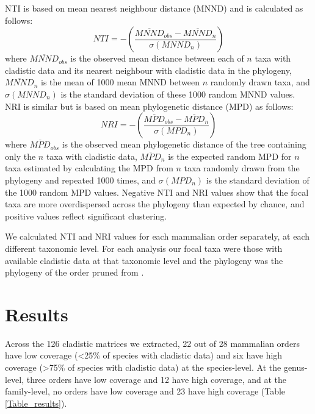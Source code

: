 NTI \citep{webb2002phylogenies} is based on mean nearest neighbour distance (MNND) and is calculated as follows:
  \begin{equation}
    NTI=-\left(\frac{\overline{MNND}_{obs}-\overline{MNND}_{n}}{\sigma(MNND_{n})}\right)
  \end{equation}
where $\overline{MNND}_{obs}$ is the observed mean distance between each of $n$ taxa with cladistic data and its nearest neighbour with cladistic data in the phylogeny, 
$\overline{MNND}_{n}$ is the mean of 1000 mean MNND between $n$ randomly drawn taxa, and $\sigma(MNND_{n})$ is the standard deviation of these 1000 random MNND values.
NRI is similar but is based on mean phylogenetic distance (MPD) as follows:
  \begin{equation}
    NRI=-\left(\frac{\overline{MPD}_{obs}-\overline{MPD}_{n}}{\sigma(MPD_{n})}\right)
  \end{equation}
where $\overline{MPD}_{obs}$ is the observed mean phylogenetic distance of the tree containing only the $n$ taxa with cladistic data, $\overline{MPD}_{n}$ is the expected random MPD for $n$ taxa estimated by calculating the MPD from $n$ taxa randomly drawn from the phylogeny and repeated 1000 times, and $\sigma(MPD_{n})$ is the standard deviation of the 1000 random MPD values. %
Negative NTI and NRI values show that the focal taxa are more overdispersed across the phylogeny than expected by chance, and positive values reflect significant clustering.

We calculated NTI and NRI values for each mammalian order separately, at each different taxonomic level. 
For each analysis our focal taxa were those with available cladistic data at that taxonomic level and the phylogeny was the phylogeny of the order pruned from \citep{bininda-emondsthe2007}.

%
%

\section{Results}
Across the 126 cladistic matrices we extracted, 22 out of 28 mammalian orders have low coverage (\textless 25\% of species with cladistic data) and six have high coverage (\textgreater 75\% of species with cladistic data) at the species-level.
At the genus-level, three orders have low coverage and 12 have high coverage, and at the family-level, no orders have low coverage and 23 have high coverage (Table \ref{Table_results}).

